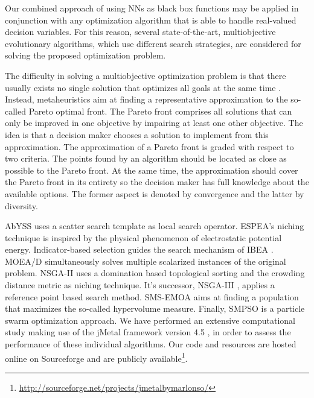 Our combined approach of using NNs as black box functions may be applied in conjunction with any optimization algorithm that is able to handle real-valued decision variables. For this reason, several state-of-the-art, multiobjective evolutionary algorithms, which use different search strategies, are considered for solving the proposed optimization problem.

The difficulty in solving a multiobjective optimization problem is that there usually exists no single solution that optimizes all goals at the same time \cite{basicDeb,basicCoello}. Instead, metaheuristics aim at finding a representative approximation to the so-called Pareto optimal front. The Pareto front comprises all solutions that can only be improved in one objective by impairing at least one other objective. The idea is that a decision maker chooses a solution to implement from this approximation. The approximation of a Pareto front is graded with respect to two criteria. The points found by an algorithm should be located as close as possible to the Pareto front. At the same time, the approximation should cover the Pareto front in its entirety so the decision maker has full knowledge about the available options. The former aspect is denoted by convergence and the latter by diversity.

AbYSS \cite{abyss} uses a scatter search template as local search operator. ESPEA's \cite{espea} niching technique is inspired by the physical phenomenon of electrostatic potential energy. Indicator-based selection guides the search mechanism of IBEA \cite{ibea}. MOEA/D \cite{moead2009} simultaneously solves multiple scalarized instances of the original problem. NSGA-II \cite{nsga2} uses a domination based topological sorting and the crowding distance metric as niching technique. It's successor, NSGA-III \cite{nsga3part1}, applies a reference point based search method. SMS-EMOA \cite{smsemoa} aims at finding a population that maximizes the so-called hypervolume measure. Finally, SMPSO \cite{smpso} is a particle swarm optimization approach. We have performed an extensive computational study making use of the jMetal framework version 4.5 \cite{jmetal2}, in order to assess the performance of these individual algorithms. Our code and resources are hosted online on Sourceforge and are publicly available\footnote{\url{http://sourceforge.net/projects/jmetalbymarlonso/}}.

